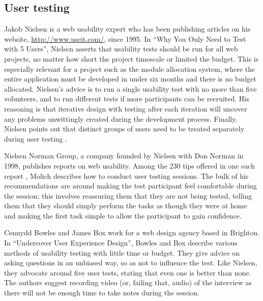 \documentclass[draft]{scrartcl}
\begin{document}




\subsection{User testing}

Jakob Nielsen is a web usability expert who has been publishing articles on
his website, \url{http://www.useit.com/}, since 1995. In ``Why You Only Need to
Test with 5 Users'', Nielsen asserts that usability tests should be run for all
web projects, no matter how short the project timescale or limited the budget.
This is especially relevant for a project such as the module allocation
system, where the entire application must be developed in under six months and
there is no budget allocated. Nielsen's advice is to run a single usability
test with no more than five volunteers, and to run different tests if more
participants can be recruited. His reasoning is that iterative design with
testing after each iteration will uncover any problems unwittingly created
during the development process. Finally, Nielsen points out that distinct
groups of users need to be treated separately during user testing
\cite{nielsen2000fiveusers}.

Nielsen Norman Group, a company founded by Nielsen with Don Norman in 1998,
publishes reports on web usability. Among the 230 tips offered in one such
report \cite{nng2001tipsusability}, Molich describes how to conduct user
testing sessions. The bulk of his recommendations are around making the test
participant feel comfortable during the session; this involves reassuring them
that they are not being tested, telling them that they should simply perform
the tasks as though they were at home and making the first task simple to
allow the participant to gain confidence.

Cennydd Bowles and James Box work for a web design agency based in Brighton.
In ``Undercover User Experience Design'', Bowles and Box describe various
methods of usability testing with little time or budget. They give advice on
asking questions in an unbiased way, so as not to influence the test. Like
Nielsen, they advocate around five user tests, stating that even one is better
than none. The authors suggest recording video (or, failing that, audio) of
the interview as there will not be enough time to take notes during the
session.
\end{document}
